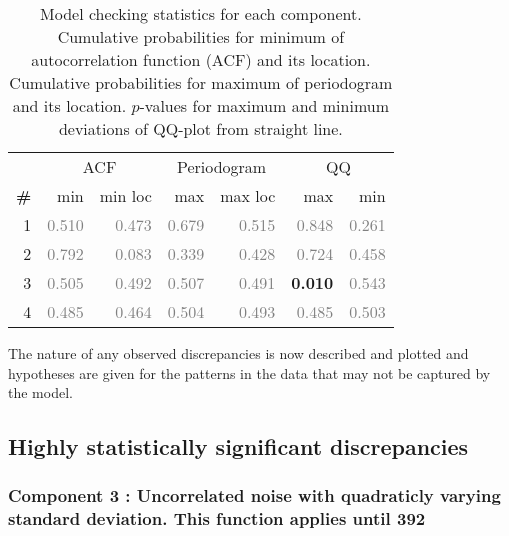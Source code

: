 \documentclass{article} %
\begin{document}
\begin{table}[htb]
\begin{center}
{\small
\begin{tabular}{|r|rr|rr|rr|}
\hline
 & \multicolumn{2}{|c|}{ACF} & \multicolumn{2}{|c|}{Periodogram} & \multicolumn{2}{|c|}{QQ} \\
\bf{\#} & {min} & {min loc} & {max} & {max loc} & {max} & {min}\\
\hline

1 & \textcolor{gray}{0.510} & \textcolor{gray}{0.473} & \textcolor{gray}{0.679} & \textcolor{gray}{0.515} & \textcolor{gray}{0.848} & \textcolor{gray}{0.261}\\

2 & \textcolor{gray}{0.792} & \textcolor{gray}{0.083} & \textcolor{gray}{0.339} & \textcolor{gray}{0.428} & \textcolor{gray}{0.724} & \textcolor{gray}{0.458}\\

3 & \textcolor{gray}{0.505} & \textcolor{gray}{0.492} & \textcolor{gray}{0.507} & \textcolor{gray}{0.491} & \textbf{0.010} & \textcolor{gray}{0.543}\\

4 & \textcolor{gray}{0.485} & \textcolor{gray}{0.464} & \textcolor{gray}{0.504} & \textcolor{gray}{0.493} & \textcolor{gray}{0.485} & \textcolor{gray}{0.503}\\

\hline
\end{tabular}
\caption{
Model checking statistics for each component.
Cumulative probabilities for minimum of autocorrelation function (ACF) and its location.
Cumulative probabilities for maximum of periodogram and its location.
$p$-values for maximum and minimum deviations of QQ-plot from straight line.
}
\label{table:check}
}
\end{center}
\end{table}

The nature of any observed discrepancies is now described and plotted and hypotheses are given for the patterns in the data that may not be captured by the model.

\subsection{Highly statistically significant discrepancies}

\subsubsection{Component 3 : Uncorrelated noise with quadraticly varying standard deviation. This function applies until  392}
\end{document}
